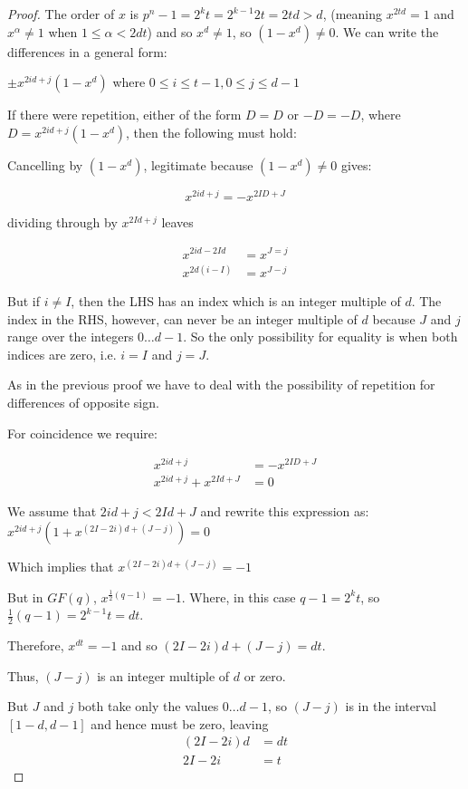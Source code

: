 \documentclass[
  11pt,
  a4paper]{book}
\begin{document}
\begin{proof}
The order of $x$ is $p^n-1 = 2^kt = 2^{k-1}2t = 2td > d$,
(meaning $x^{2td} = 1$ and $x^\alpha \neq 1$ when
$1 \leq \alpha < 2dt$) and so $x^d \neq 1$, so $(1 - x^d) \neq 0$.
We can write the differences in a general form:

$\pm x^{2id + j}(1 - x^d)$ where
$0 \leq i \leq t-1, 0 \leq j \leq d-1$

If there were repetition, either of the
form $D = D$ or $-D = -D$, where $D = x^{2id + j}(1 - x^d)$,
then the following must hold:

Cancelling by $(1 - x^d)$, legitimate because $(1 - x^d) \neq 0$
gives:

$$x^{2id + j} = -x^{2ID + J}$$

dividing through by $x^{2Id + j}$ leaves

\begin{eqnarray*}
  x^{2id - 2Id} &= x^{J = j} \\
  x^{2d(i - I)} &= x^{J - j}
\end{eqnarray*}

But if $i \neq I$, then the LHS has an index which is an
integer multiple of $d$. The index in the RHS, however, can
never be an integer multiple of $d$ because $J$ and $j$
range over the integers $0 \ldots d - 1$.  So the only possibility
for equality is when both indices are zero, i.e. $i = I$ and
$j = J$.

As in the previous proof we have to deal with the
possibility of repetition for differences of opposite sign.

For coincidence we require:

\begin{eqnarray*}
  x^{2id + j} &= -x^{2ID + J} \\
  x^{2id + j} + x^{2Id + J} &= 0
\end{eqnarray*}

We assume that $2id + j < 2Id + J$ and rewrite this expression
as: $x^{2id + j}(1 + x^{(2I - 2i)d + (J - j)}) = 0$

Which implies that $x^{(2I - 2i)d + (J - j)} = -1$

But in $GF(q)$, $x^{\frac{1}{2}(q - 1)} = -1$. Where, in this
case $q - 1 = 2^kt$, so $\frac{1}{2}(q - 1) = 2^{k - 1}t = dt$.

Therefore, $x^{dt} = -1$ and so $(2I - 2i)d + (J - j) = dt$.

Thus, $(J - j)$ is an integer multiple of $d$ or zero.

But $J$ and $j$ both take only the values $0 \ldots d-1$, so
$(J - j)$ is in the interval $[1 - d, d - 1]$ and hence must
be zero, leaving
\begin{eqnarray*}
  (2I - 2i)d &= dt \\
  2I - 2i &= t
\end{eqnarray*}


\end{proof}
\end{document}
